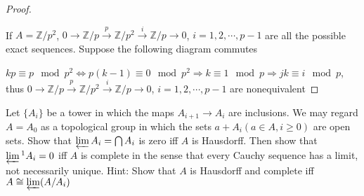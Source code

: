 \documentclass{article}
\newenvironment{exercise}[2][Exercise]{\begin{trivlist}
\item[\hskip \labelsep {\bfseries #1}\hskip \labelsep {\bfseries #2.}]}{\end{trivlist}}
\theoremstyle{definition}
\theoremstyle{remark}
\theoremstyle{definition}
\begin{document}
\begin{proof}
\begin{center}
\end{center}
If $A=\mathbb Z/p^2$, $0\to\mathbb Z/p\xrightarrow{p}\mathbb Z/p^2\xrightarrow i\mathbb Z/p\to0$, $i=1,2,\cdots,p-1$ are all the possible exact sequences. Suppose the following diagram commutes
\begin{center}
\end{center}
$kp\equiv p\mod p^2\Leftrightarrow p(k-1)\equiv0\mod p^2\Rightarrow k\equiv1\mod p\Rightarrow jk\equiv i\mod p$, thus $0\to\mathbb Z/p\xrightarrow{p}\mathbb Z/p^2\xrightarrow i\mathbb Z/p\to0$, $i=1,2,\cdots,p-1$ are nonequivalent
\end{proof}

\begin{exercise}{\textbf{3.5.1}}
Let $\{A_i\}$ be a tower in which the maps $A_{i+1}\to A_i$ are inclusions. We may regard $A=A_0$ as a topological group in which the sets $a+A_i(a\in A,i\geq0)$ are open sets. Show that $\varprojlim A_i=\bigcap A_i$ is zero iff $A$ is Hausdorff. Then show that $\varprojlim\textstyle^1A_i=0$ iff $A$ is complete in the sense that every Cauchy sequence has a limit, not necessarily unique. Hint: Show that $A$ is Hausdorff and complete iff $A\cong\varprojlim(A/A_i)$
\end{exercise}
\end{document}
